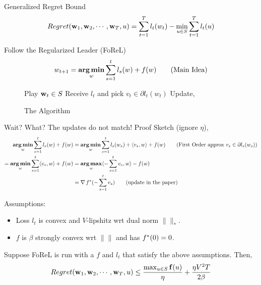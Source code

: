 \begin{frame}{Generalized Regret Bound}
  \begin{align*}
    Regret(\operatorname{\mathbf{w}}_1,\operatorname{\mathbf{w}}_2,\cdots,\operatorname{\mathbf{w}}_T,u) = \sum_{t=1}^T l_t(w_t) - \min_{u \in S} \sum_{t=1}^T l_t(u)
  \end{align*}
\end{frame}

\begin{frame}{Follow the Regularized Leader (FoReL)}
  \begin{align*}
    w_{t+1} = \operatorname*{\mathbf{arg\,min}}_w \sum_{s=1}^t l_s(w) + f(w) \tag{Main Idea}
  \end{align*}
  \begin{figure}
  \begin{algorithmic}[1]
    \State Play $\operatorname{\mathbf{w}}_t \in S$
    \State Receive $l_t$ and pick $v_t \in \partial l_t(w_t)$
    \State Update,
    \EndFor
  \end{algorithmic}
  \caption{The Algorithm}
  \end{figure}
\end{frame}

\begin{frame}{Wait? What? The updates do not match!}
  Proof Sketch (ignore $\eta$),
  \begin{align*}
    \operatorname*{\mathbf{arg\,min}}_w \sum_{s=1}^t l_s(w) + f(w) &= \operatorname*{\mathbf{arg\,min}}_w \sum_{s=1}^t l_s(w_s)+\langle {v_s} , {w} \rangle + f(w) \tag{First Order approx $v_s \in  \partial l_s(w_s)$} \\
    = \operatorname*{\mathbf{arg\,min}}_w \sum_{s=1}^t \langle {v_s} , {w} \rangle + f(w) &= \operatorname*{\mathbf{arg\,max}}_w \langle {-\sum_{s=1}^t v_s} , {w} \rangle -f(w) \\
    &= \operatorname{\nabla} {f}^{*}(-\sum_{s=1}^t v_s) \tag{update in the paper}
  \end{align*}
\end{frame}
\begin{frame}
  Assumptions:
  \begin{itemize}
  \item Loss $l_t$ is convex and $V$-lipshitz wrt dual norm $\|\|_{*}$.
  \item $f$ is $\beta$ strongly convex wrt $\|\|$ and has ${f}^{*}(0)=0$.
  \end{itemize}

  \begin{theorem}
    Suppose FoReL is run with a $f$ and $l_t$ that satisfy the above assumptions. Then,
    \begin{align*}    
      Regret(\operatorname{\mathbf{w}}_1,\operatorname{\mathbf{w}}_2,\cdots,\operatorname{\mathbf{w}}_T,u) \le \frac{\max_{u \in S} \operatorname{\mathbf{f}}(u)}{\eta} + \frac{\eta V^2T}{2\beta}
    \end{align*}  
  \end{theorem}
\end{frame}

